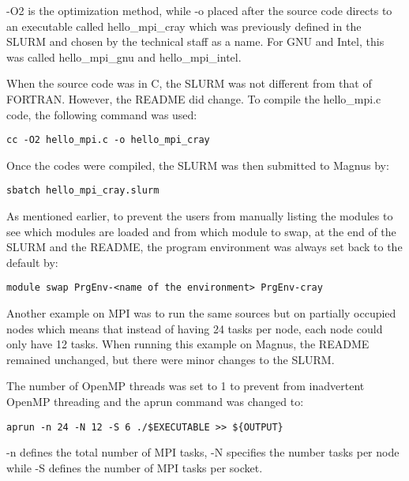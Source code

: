 -O2 is the optimization method, while -o placed after the source code directs to an executable called hello\_mpi\_cray which was previously defined in
the SLURM and chosen by the technical staff as a name. For GNU and Intel, this was called hello\_mpi\_gnu and hello\_mpi\_intel. 

When the source code was in C, the SLURM was not different from that of FORTRAN. However, the README did change. To compile the hello\_mpi.c code, the 
following command was used: 

\begin{tcolorbox}
\begin{Verbatim}[fontsize=\scriptsize]
cc -O2 hello_mpi.c -o hello_mpi_cray
\end{Verbatim}
\end{tcolorbox}

Once the codes were compiled, the SLURM was then submitted to Magnus by:

\begin{tcolorbox}
\begin{Verbatim}[fontsize=\scriptsize]
sbatch hello_mpi_cray.slurm 
\end{Verbatim}
\end{tcolorbox}

As mentioned earlier, to prevent the users from manually listing the modules to see which modules are loaded and from which module to swap, at the end
of the SLURM and the README, the program environment was always set back to the default by:

\begin{tcolorbox}
\begin{Verbatim}[fontsize=\scriptsize]
module swap PrgEnv-<name of the environment> PrgEnv-cray
\end{Verbatim}
\end{tcolorbox}

Another example on MPI was to run the same sources but on partially occupied nodes which means that instead of having 24 tasks per node, each node could
only have 12 tasks. When running this example on Magnus, the README remained unchanged, but there were minor changes to the SLURM.

The number of OpenMP threads was set to 1 to prevent from inadvertent OpenMP threading and the aprun command was changed to:

\begin{tcolorbox}
\begin{Verbatim}[fontsize=\scriptsize]
aprun -n 24 -N 12 -S 6 ./$EXECUTABLE >> ${OUTPUT}
\end{Verbatim}
\end{tcolorbox}

-n defines the total number of MPI tasks, -N specifies the number tasks per node while -S defines the number of MPI tasks per socket.

